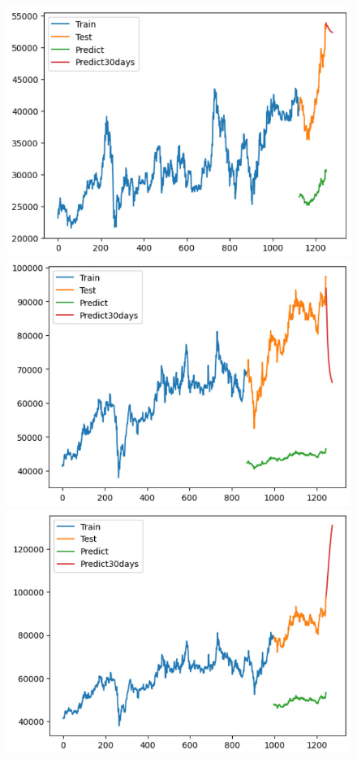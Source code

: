 \begin{figure}[H]
\begin{minipage}{0.15\textwidth}
    \centering
    \includegraphics[width=1\textwidth]{resources/chapter-5/result/BIDV_LSTM_9_1.jpg}
    \end{minipage}
    \hfill
    \begin{minipage}{0.15\textwidth}
    \centering
    \includegraphics[width=1\textwidth]{resources/chapter-5/result/VCB_LSTM_7_3.jpg}
    \end{minipage}
    \hfill
    \begin{minipage}{0.15\textwidth}
    \centering
    \includegraphics[width=1\textwidth]{resources/chapter-5/result/VCB_LSTM_8_2.jpg}

\end{minipage}
\end{figure}
